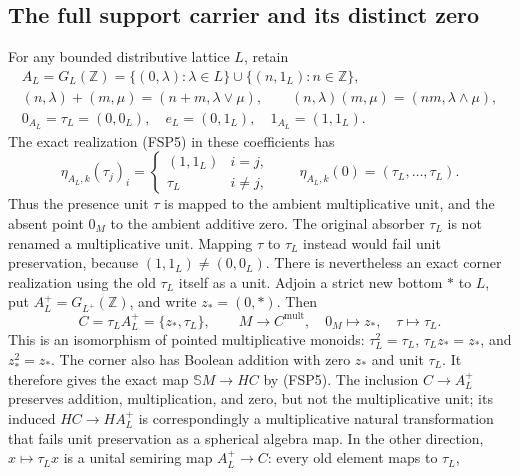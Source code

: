 \subsection{The full support carrier and its distinct zero}

For any bounded distributive lattice $L$, retain
\begin{equation}\tag{FSP13}
\begin{gathered}
A_L=G_L(\mathbb Z)=\{(0,\lambda):\lambda\in L\}
           \cup\{(n,1_L):n\in\mathbb Z\},\\
(n,\lambda)+(m,\mu)=(n+m,\lambda\vee\mu),\qquad
(n,\lambda)(m,\mu)=(nm,\lambda\wedge\mu),\\
0_{A_L}=\tau_L=(0,0_L),\quad e_L=(0,1_L),\quad
1_{A_L}=(1,1_L).
\end{gathered}
\end{equation}
The exact realization (FSP5) in these coefficients has
\begin{equation}\tag{FSP14}
\eta_{A_L,k}(\tau_j)_i=
\begin{cases}(1,1_L)&i=j,\\\tau_L&i\ne j,\end{cases}
\qquad \eta_{A_L,k}(0)=(\tau_L,\ldots,\tau_L).
\end{equation}
Thus the presence unit $\tau$ is mapped to
the ambient multiplicative unit, and the absent point
$0_M$ to the ambient additive zero. The original absorber
$\tau_L$ is not renamed a multiplicative unit. Mapping
$\tau$ to $\tau_L$ instead would fail unit
preservation, because $(1,1_L)\ne(0,0_L)$.
There is nevertheless an exact corner realization using
the old $\tau_L$ itself as a unit. Adjoin a strict new
bottom $*$ to $L$, put $A_L^+=G_{L^+}(\mathbb Z)$,
and write $z_*=(0,*)$. Then
\begin{equation}\tag{FSP14a}
C=\tau_L A_L^+=\{z_*,\tau_L\},\qquad
M\longrightarrow C^{\mathrm{mult}},\quad
0_M\longmapsto z_*,\quad\tau\longmapsto\tau_L.
\end{equation}
This is an isomorphism of pointed multiplicative monoids:
$\tau_L^2=\tau_L$, $\tau_Lz_*=z_*$, and $z_*^2=z_*$.
The corner also has Boolean addition with zero $z_*$
and unit $\tau_L$. It therefore gives the exact map
$\mathbb S M\to HC$ by (FSP5).
The inclusion $C\to A_L^+$ preserves addition,
multiplication, and zero, but not the multiplicative unit;
its induced $HC\to HA_L^+$ is correspondingly a
multiplicative natural transformation that fails unit
preservation as a spherical algebra map. In the other
direction, $x\mapsto\tau_Lx$ is a unital semiring map
$A_L^+\to C$: every old element maps to $\tau_L$,
